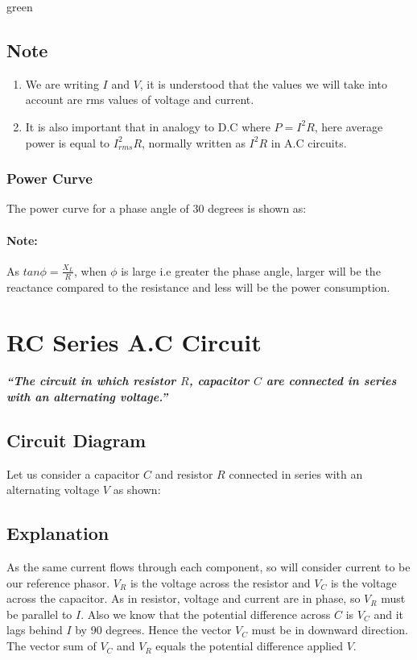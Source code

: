 \begin{mybox}{green}{}
\subsection*{\note{}Note}
\begin{enumerate}[label = $\square$]
\item We are writing $I$ and $V$, it is understood that the
values we will take into account are rms values of voltage and current.
\item It is also important that in analogy to D.C where
$P = I^{2}R$, here average power is equal to $I_{rms}^{2}R$,
normally written as $I^{2}R$ in A.C circuits.
\end{enumerate}
\end{mybox}
\subsubsection{Power Curve}
The power curve for a phase angle of 30 degrees is shown as:

\paragraph{Note:}
As $tan \phi = \frac{X_{L}}{R}$, when $\phi$ is large i.e greater the
phase angle, larger will be the reactance compared to the resistance
and less will be the power consumption.

\section{RC Series A.C Circuit}
\textit{\textbf{“The circuit in which resistor $R$, capacitor $C$ are
connected in series with an alternating voltage.”}}
\subsection*{Circuit Diagram}
Let us consider a capacitor $C$ and resistor $R$ connected in series
with an alternating voltage $V$ as shown:

\subsection*{Explanation}
As the same current flows through each component, so will consider
current to be our reference phasor. $V_{R}$ is the voltage across the
resistor and $V_{C}$ is the voltage across the capacitor.
As in resistor, voltage and current are in phase, so $V_{R}$ must be
parallel to $I$. Also we know that the potential difference across $C$
is $V_{C}$ and it lags behind $I$ by 90 degrees. Hence the vector
$V_{C}$ must be in downward direction. The vector sum of $V_{C}$
and $V_{R}$ equals the potential difference applied $V$.

